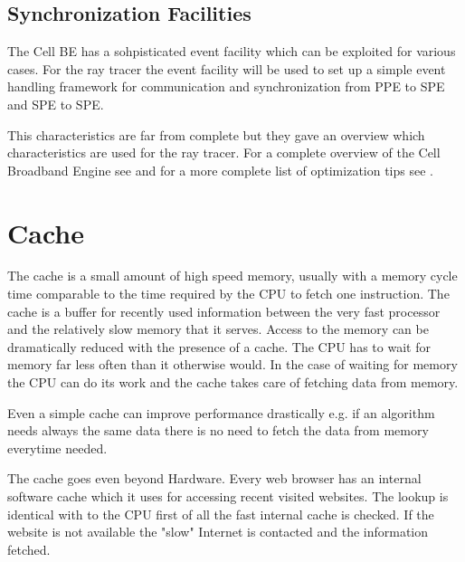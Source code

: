 \documentclass[DIV10, abstracton, openright, footsepline, headsepline, twoside, 9pt,
bigheadings]{scrreprt}
\begin{document}
\subsection{Synchronization Facilities}
\label{sec:synch}
The Cell BE has a sohpisticated event facility which can be exploited for
various cases. For the ray tracer the event facility will be used to
set up a simple event handling framework for communication and
synchronization  from PPE to SPE and SPE to SPE.

This characteristics are far from complete but they gave an overview
which characteristics are used for the ray tracer. For a complete overview
of the Cell Broadband Engine see \cite{IBMhba06} and for a more complete list
of optimization tips see \cite{Brokenshire06}.

\newpage
\section{Cache}
\label{sec:cache}
\label{sec:cache_analysis}
The cache is a small amount of high speed memory, usually with a memory cycle
time comparable to the time required by the CPU to fetch one instruction. The
cache is a buffer for recently used information between the very fast processor
and the relatively slow memory that it serves. Access to the memory can be
dramatically reduced with the presence of a cache. The CPU has to wait for
memory far less often than it otherwise would. In the case of waiting for memory
the CPU can do its work and the cache takes care of fetching data from memory.

Even a simple cache can improve performance drastically e.g. if an algorithm
needs always the same data there is no need to fetch the data from memory
everytime needed.

The cache goes even beyond Hardware. Every web browser has an internal software
cache which it uses for accessing recent visited websites. The lookup is
identical with to the CPU first of all the fast internal cache is checked. If
the website is not available the "slow" Internet is contacted and the
information fetched.
\end{document}
